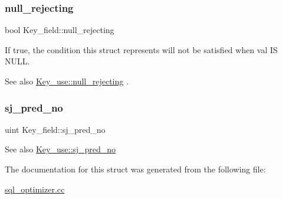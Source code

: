 \subsubsection{\texorpdfstring{null\+\_\+rejecting}{null\_rejecting}}
{\footnotesize\ttfamily bool Key\+\_\+field\+::null\+\_\+rejecting}

If true, the condition this struct represents will not be satisfied when val IS N\+U\+LL. \begin{DoxySeeAlso}{See also}
\mbox{\hyperlink{classKey__use_acba461fa75819da0303af030700a8d5b}{Key\+\_\+use\+::null\+\_\+rejecting}} . 
\end{DoxySeeAlso}
\mbox{\label{structKey__field_a3875eb5a8e4115e34a319bd770b251c8}} 
\subsubsection{\texorpdfstring{sj\+\_\+pred\+\_\+no}{sj\_pred\_no}}
{\footnotesize\ttfamily uint Key\+\_\+field\+::sj\+\_\+pred\+\_\+no}

\begin{DoxySeeAlso}{See also}
\mbox{\hyperlink{classKey__use_a72971098712c22d6ab436e02a66837d4}{Key\+\_\+use\+::sj\+\_\+pred\+\_\+no}} 
\end{DoxySeeAlso}


The documentation for this struct was generated from the following file\+:\begin{DoxyCompactItemize}
\item 
\mbox{\hyperlink{sql__optimizer_8cc}{sql\+\_\+optimizer.\+cc}}\end{DoxyCompactItemize}
